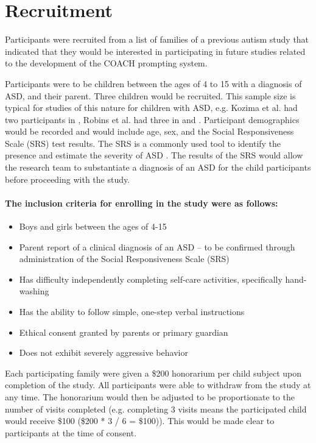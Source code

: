 \section{Recruitment}

Participants were recruited from a list of families of a previous autism study that indicated that they would be interested in participating in future studies related to the development of the COACH prompting system.

Participants were to be children between the ages of 4 to 15 with a diagnosis of ASD, and their parent. Three children would be recruited. This sample size is typical for studies of this nature for children with ASD, e.g. Kozima et al. had two participants in
\cite{kozima2005interactive}, Robins et al. had three in \cite{robins2004robot} and \cite{robins2009isolation}.  Participant demographics would be recorded and would include age, sex, and the Social Responsiveness Scale (SRS) test results.  The SRS is a commonly used tool to identify the presence and estimate the severity of ASD \cite{constantino2002social}. The results of the SRS would allow the research team to substantiate a diagnosis of an ASD for the child participants before proceeding with the study.

\paragraph{The \textbf{inclusion criteria} for enrolling in the study were as follows:}
\begin{itemize}
	\item Boys and girls between the ages of 4-15
	\item Parent report of a clinical diagnosis of an ASD – to be confirmed through administration of the Social Responsiveness Scale (SRS)
	\item Has difficulty independently completing self-care activities, specifically hand-washing
	\item Has the ability to follow simple, one-step verbal instructions
	\item Ethical consent  granted by parents or primary guardian
	\item Does not exhibit severely aggressive behavior
\end{itemize}

Each participating family were given a \$200 honorarium per child subject upon completion of the study. All participants were able to withdraw from the study at any time. The honorarium would then be adjusted to be proportionate to the number of visits completed (e.g. completing 3 visits means the participated child would receive \$100 (\$200 * 3 / 6 = \$100)). This would be made clear to participants at the time of consent.
